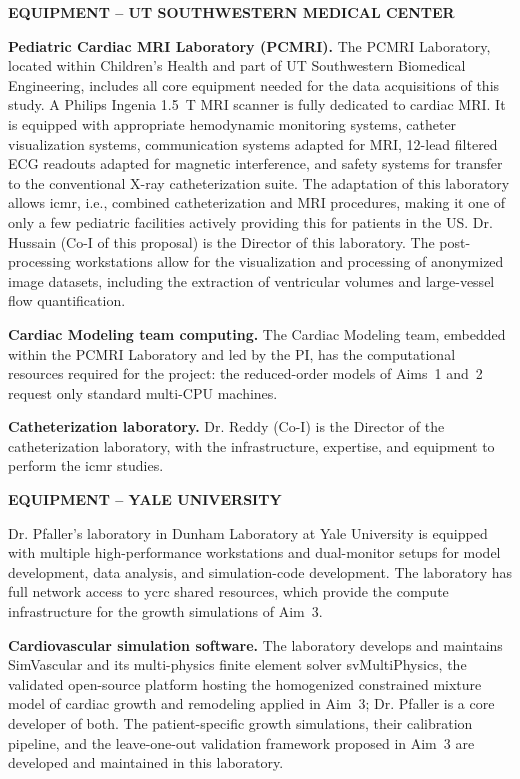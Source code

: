 \documentclass[11pt]{article}
\begin{document}
\textbf{\uppercase{Equipment -- UT Southwestern Medical Center}}

\textbf{Pediatric Cardiac MRI Laboratory (PCMRI).} The PCMRI Laboratory, located within Children's Health and part of UT Southwestern Biomedical Engineering, includes all core equipment needed for the data acquisitions of this study. A Philips Ingenia 1.5~T MRI scanner is fully dedicated to cardiac MRI. It is equipped with appropriate hemodynamic monitoring systems, catheter visualization systems, communication systems adapted for MRI, 12-lead filtered ECG readouts adapted for magnetic interference, and safety systems for transfer to the conventional X-ray catheterization suite. The adaptation of this laboratory allows \gls*{icmr}, i.e., combined catheterization and MRI procedures, making it one of only a few pediatric facilities actively providing this for patients in the US. Dr. Hussain (Co-I of this proposal) is the Director of this laboratory. The post-processing workstations allow for the visualization and processing of anonymized image datasets, including the extraction of ventricular volumes and large-vessel flow quantification.

\textbf{Cardiac Modeling team computing.} The Cardiac Modeling team, embedded within the PCMRI Laboratory and led by the PI, has the computational resources required for the project: the reduced-order models of Aims~1 and~2 request only standard multi-CPU machines.

\textbf{Catheterization laboratory.} Dr. Reddy (Co-I) is the Director of the catheterization laboratory, with the infrastructure, expertise, and equipment to perform the \gls*{icmr} studies.

\textbf{\uppercase{Equipment -- Yale University}}

Dr. Pfaller's laboratory in Dunham Laboratory at Yale University is equipped with multiple high-performance workstations and dual-monitor setups for model development, data analysis, and simulation-code development. The laboratory has full network access to \gls*{ycrc} shared resources, which provide the compute infrastructure for the growth simulations of Aim~3.

\textbf{Cardiovascular simulation software.} The laboratory develops and maintains SimVascular and its multi-physics finite element solver svMultiPhysics, the validated open-source platform hosting the homogenized constrained mixture model of cardiac growth and remodeling applied in Aim~3; Dr. Pfaller is a core developer of both. The patient-specific growth simulations, their calibration pipeline, and the leave-one-out validation framework proposed in Aim~3 are developed and maintained in this laboratory.
\end{document}
